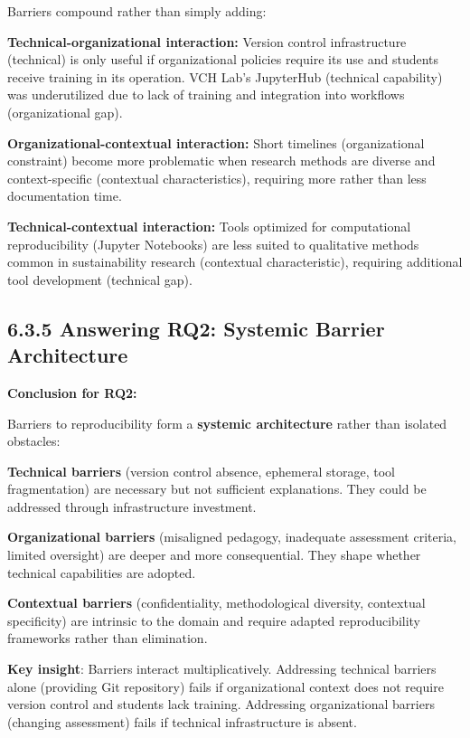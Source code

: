 \documentclass[
  oneside,
  open=any]{scrbook}
\begin{document}
Barriers compound rather than simply adding:

\textbf{Technical-organizational interaction:} Version control
infrastructure (technical) is only useful if organizational policies
require its use and students receive training in its operation. VCH
Lab's JupyterHub (technical capability) was underutilized due to lack of
training and integration into workflows (organizational gap).

\textbf{Organizational-contextual interaction:} Short timelines
(organizational constraint) become more problematic when research
methods are diverse and context-specific (contextual characteristics),
requiring more rather than less documentation time.

\textbf{Technical-contextual interaction:} Tools optimized for
computational reproducibility (Jupyter Notebooks) are less suited to
qualitative methods common in sustainability research (contextual
characteristic), requiring additional tool development (technical gap).

\subsection{6.3.5 Answering RQ2: Systemic Barrier
Architecture}\label{answering-rq2-systemic-barrier-architecture}

\textbf{Conclusion for RQ2:}

Barriers to reproducibility form a \textbf{systemic architecture} rather
than isolated obstacles:

\textbf{Technical barriers} (version control absence, ephemeral storage,
tool fragmentation) are necessary but not sufficient explanations. They
could be addressed through infrastructure investment.

\textbf{Organizational barriers} (misaligned pedagogy, inadequate
assessment criteria, limited oversight) are deeper and more
consequential. They shape whether technical capabilities are adopted.

\textbf{Contextual barriers} (confidentiality, methodological diversity,
contextual specificity) are intrinsic to the domain and require adapted
reproducibility frameworks rather than elimination.

\textbf{Key insight}: Barriers interact multiplicatively. Addressing
technical barriers alone (providing Git repository) fails if
organizational context does not require version control and students
lack training. Addressing organizational barriers (changing assessment)
fails if technical infrastructure is absent.
\end{document}
